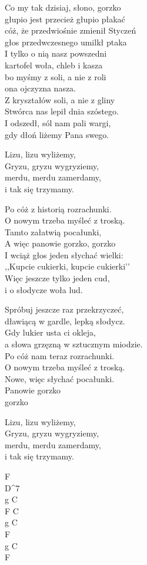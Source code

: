 \begin{text}
    Co my tak dzisiaj, słono, gorzko\\
    głupio jest przecież głupio płakać\\
    cóż, że przedwiośnie zmienił Styczeń\\
    głos przedwczesnego umilkł ptaka\\
    I tylko o nią nasz powszedni\\
    kartofel woła, chleb i kasza\\
    bo myśmy z soli, a nie z roli\\
    ona ojczyzna nasza.\\
    Z kryształów soli, a nie z gliny\\
    Stwórca nas lepił dnia szóstego.\\
    I odszedł, sól nam pali wargi,\\
    gdy dłoń liżemy Pana swego.

    \vin Lizu, lizu wyliżemy,\\
    \vin Gryzu, gryzu wygryziemy,\\
    \vin merdu, merdu zamerdamy,\\
    \vin i tak się trzymamy.

    Po cóż z historią rozrachunki.\\
    O nowym trzeba myśleć z troską.\\
    Tamto załatwią pocałunki,\\
    A więc panowie gorzko, gorzko\\
    I wciąż głos jeden słychać wielki:\\
    ,,Kupcie cukierki, kupcie cukierki’’\\
    Więc jeszcze tylko jeden cud,\\
    i o słodycze woła lud.

    Spróbuj jeszcze raz przekrzyczeć,\\
    dławiącą w gardle, lepką słodycz.\\
    Gdy lukier usta ci okleja,\\
    a słowa grzęzną w sztucznym miodzie.\\
    Po cóż nam teraz rozrachunki.\\
    O nowym trzeba myśleć z troską.\\
    Nowe, więc słychać pocałunki.\\
    Panowie gorzko\\
    gorzko

    Lizu, lizu wyliżemy,\\
    Gryzu, gryzu wygryziemy,\\
    merdu, merdu zamerdamy,\\
    i tak się trzymamy.
\end{text}
\begin{chord}
    F\\
    D^7\\
    g C\\
    F C\\
    g C\\
    F\\
    g C\\
    F
\end{chord}
